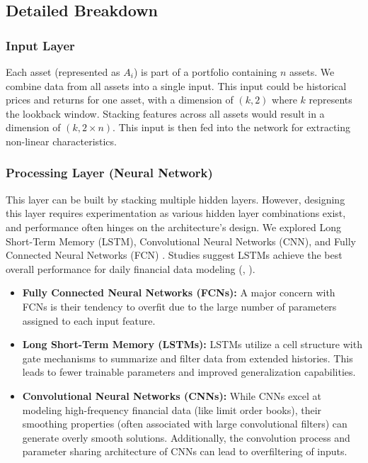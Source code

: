 \subsection{Detailed Breakdown}

\subsubsection{Input Layer}

Each asset (represented as $A_i$) is part of a portfolio containing $n$ assets. We combine data from all assets into a single input. This input could be historical prices and returns for one asset, with a dimension of $(k, 2)$ where $k$ represents the lookback window. Stacking features across all assets would result in a dimension of $(k, 2 \times n)$. This input is then fed into the network for extracting non-linear characteristics.

\subsubsection{Processing Layer (Neural Network)}

This layer can be built by stacking multiple hidden layers. However, designing this layer requires experimentation as various hidden layer combinations exist, and performance often hinges on the architecture's design. We explored Long Short-Term Memory (LSTM), Convolutional Neural Networks (CNN), and Fully Connected Neural Networks (FCN) \citep{Hochreiter19971735}. Studies suggest LSTMs achieve the best overall performance for daily financial data modeling (\citep{8081663}, \citep{lim2020enhancing}).

\begin{itemize}
    \item \textbf{Fully Connected Neural Networks (FCNs):} A major concern with FCNs is their tendency to overfit due to the large number of parameters assigned to each input feature.
    \item \textbf{Long Short-Term Memory (LSTMs):} LSTMs utilize a cell structure with gate mechanisms to summarize and filter data from extended histories. This leads to fewer trainable parameters and improved generalization capabilities.
    \item \textbf{Convolutional Neural Networks (CNNs):} While CNNs excel at modeling high-frequency financial data (like limit order books), their smoothing properties (often associated with large convolutional filters) can generate overly smooth solutions. Additionally, the convolution process and parameter sharing architecture of CNNs can lead to overfiltering of inputs.
\end{itemize}

